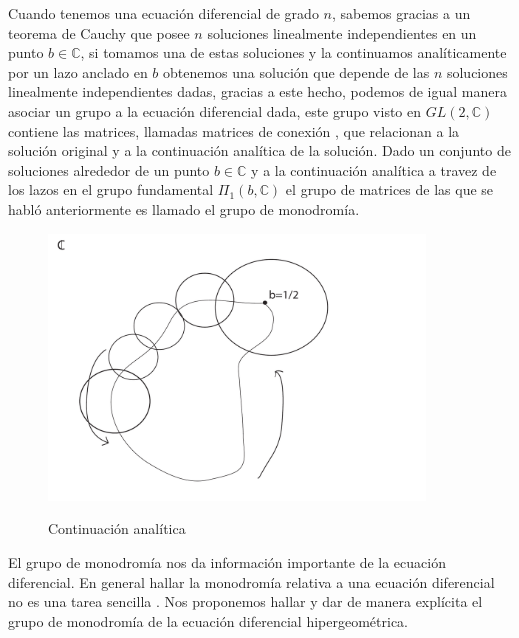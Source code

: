 \begin{resumen}        %

\renewcommand\baselinestretch{3}

Cuando tenemos una ecuaci\'on diferencial de grado $n$, sabemos gracias a un teorema de Cauchy que posee $n$ soluciones linealmente independientes en un punto $b \in \mathbb{C}$, si tomamos una de estas soluciones y la continuamos anal\'iticamente por un lazo anclado en $b$ obtenemos una soluci\'on que depende de las $n$ soluciones linealmente independientes dadas, gracias a este hecho, podemos de igual manera asociar un grupo a la ecuaci\'on diferencial dada, este grupo visto en $GL(2,\mathbb{C})$ contiene las matrices, llamadas matrices de conexi\'on , que relacionan a la soluci\'on original y a la continuaci\'on anal\'itica de la soluci\'on. Dado un conjunto de soluciones alrededor de un punto  $b \in \mathbb{C} $ y a la continuaci\'on anal\'itica a travez de los lazos en el grupo fundamental $\Pi_{1} (b,\mathbb{C})$ el grupo de matrices de las que se habl\'o anteriormente es llamado el grupo de monodrom\'ia.

\begin{figure}[h]
  \centering
  \includegraphics[width=10cm]{abstract-dibujo1.pdf}\\
  \caption{Continuaci\'on anal\'itica}
\end{figure}




El grupo de monodrom\'ia nos da informaci\'on importante  de la ecuaci\'on diferencial. En general hallar la monodrom\'ia relativa a una ecuaci\'on diferencial no es una tarea sencilla . %
Nos proponemos  hallar y dar de manera expl\'icita %
el grupo de monodrom\'ia de la ecuaci\'on diferencial hipergeom\'etrica.


\end{resumen}
